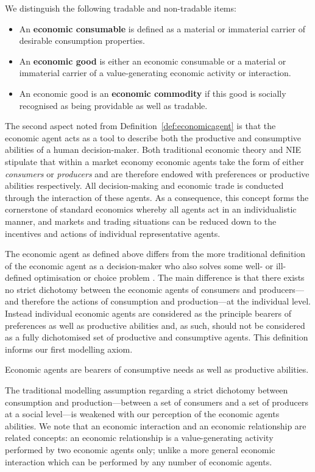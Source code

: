 \begin{definition} \label{economicgoods}
We distinguish the following tradable and non-tradable items:
\begin{itemize}
\item An \textbf{economic consumable} is defined as a material or immaterial carrier of desirable consumption properties.

\item An \textbf{economic good} is either an economic consumable or a material or immaterial carrier of a value-generating economic activity or interaction.

\item An economic good is an \textbf{economic commodity} if this good is socially recognised as being providable as well as tradable.
\end{itemize}
\end{definition}
The second aspect noted from Definition~\ref{def:economicagent} is that the economic agent acts as a tool to describe both the productive and consumptive abilities of a human decision-maker. Both traditional economic theory and NIE stipulate that within a market economy economic agents take the form of either \emph{consumers} or \emph{producers} and are therefore endowed with preferences or productive abilities respectively. All decision-making and economic trade is conducted through the interaction of these agents. As a consequence, this concept forms the cornerstone of standard economics whereby all agents act in an individualistic manner, and markets and trading situations can be reduced down to the incentives and actions of individual representative agents.

The economic agent as defined above differs from the more traditional definition of the economic agent as a decision-maker who also solves some well- or ill-defined optimisation or choice problem \citep{MasColellWhinstonGreen1995}. The main difference is that there exists no strict dichotomy between the economic agents of consumers and producers---and therefore the actions of consumption and production---at the individual level. Instead individual economic agents are considered as the principle bearers of preferences as well as productive abilities and, as such, should not be considered as a fully dichotomised set of productive and consumptive agents. This definition informs our first modelling axiom.
\begin{axiom} \label{dichotomyhype}
Economic agents are bearers of consumptive needs as well as productive abilities.
\end{axiom}
The traditional modelling assumption regarding a strict dichotomy between consumption and production---between a set of consumers and a set of producers at a social level---is weakened with our perception of the economic agents abilities. We note that an economic interaction and an economic relationship are related concepts: an economic relationship is a value-generating activity performed by two economic agents only; unlike a more general economic interaction which can be performed by any number of economic agents.

